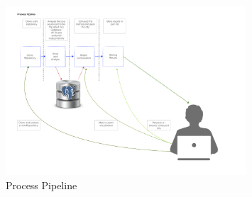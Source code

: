 \documentclass[]{usiinfbachelorproject}
\begin{document}
\begin{figure}[H]
	\centering
	\includegraphics[width=0.8\textwidth]{images/processPipeline}
	
	\caption[Process Pipeline]{Process Pipeline\label{fig:processPipeline}}

\end{figure}
\end{document}
